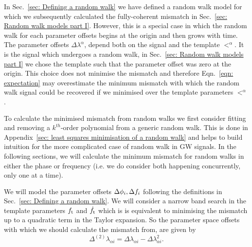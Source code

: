 
In Sec.~\ref{sec: Defining a random walk} we have defined a random walk model
for which we subsequently calculated the fully-coherent mismatch in
Sec.~\ref{sec: Random walk models part I}. However, this is a special case in
which the random walk for each parameter offsets begins at the origin and then
grows with time. The parameter offsets $\Delta\lambda^{\alpha}$, depend both on
the signal and the template $\lt^{\alpha}$. It is the signal which undergoes a random walk, in Sec.~\ref{sec:
Random walk models part I} we chose the template such that the parameter offset
was zero at the origin. This choice does not minimise the mismatch and therefore
Eqn.~\eqref{eqn: expectation} may overestimate the minimum mismatch
with which the random walk signal could be recovered if we minimised over the
template parameters $\lt^{\alpha}$.

To calculate the minimised mismatch from random walks we first consider
fitting and removing a $k^{th}$-order polynomial from a generic random walk. This
is done in Appendix~\ref{sec: least squares minimisation of a random walk} and
helps to build intuition for the more complicated case of random walk in
GW signals. In the following sections, we will calculate the minimum
mismatch for random walks in either the phase or frequency (i.e. we do
consider both happening concurrently, only one at a time).

We will model the parameter offsets $\Delta\phi_{i}, \Delta f_{i}$
following the definitions in Sec.~\ref{sec: Defining a random walk}.
We will consider a narrow band search in the template parameters
$f_\textrm{t}$ and $\dot{f}_\textrm{t}$ which is
is equivalent to minimising the mismatch up to a quadratic term in the Taylor
expansion. So the parameter space offsets with which we should calculate the
mismatch from, are given by
\begin{equation}
\Delta^{(2)}\lambda_{\alpha i} = \Delta\lambda_{\alpha i} - \Delta\lambda_{\alpha i}^{2}.
\end{equation}


